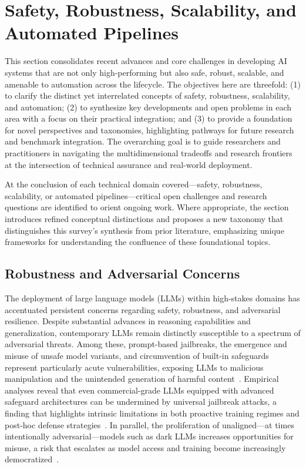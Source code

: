 \documentclass[sigconf]{acmart}
\begin{document}
\section{Safety, Robustness, Scalability, and Automated Pipelines}

This section consolidates recent advances and core challenges in developing AI systems that are not only high-performing but also safe, robust, scalable, and amenable to automation across the lifecycle. The objectives here are threefold: (1) to clarify the distinct yet interrelated concepts of safety, robustness, scalability, and automation; (2) to synthesize key developments and open problems in each area with a focus on their practical integration; and (3) to provide a foundation for novel perspectives and taxonomies, highlighting pathways for future research and benchmark integration. The overarching goal is to guide researchers and practitioners in navigating the multidimensional tradeoffs and research frontiers at the intersection of technical assurance and real-world deployment.


At the conclusion of each technical domain covered—safety, robustness, scalability, or automated pipelines—critical open challenges and research questions are identified to orient ongoing work. Where appropriate, the section introduces refined conceptual distinctions and proposes a new taxonomy that distinguishes this survey's synthesis from prior literature, emphasizing unique frameworks for understanding the confluence of these foundational topics.

\subsection{Robustness and Adversarial Concerns}

The deployment of large language models (LLMs) within high-stakes domains has accentuated persistent concerns regarding safety, robustness, and adversarial resilience. Despite substantial advances in reasoning capabilities and generalization, contemporary LLMs remain distinctly susceptible to a spectrum of adversarial threats. Among these, prompt-based jailbreaks, the emergence and misuse of unsafe model variants, and circumvention of built-in safeguards represent particularly acute vulnerabilities, exposing LLMs to malicious manipulation and the unintended generation of harmful content~\cite{ref78,ref82}. Empirical analyses reveal that even commercial-grade LLMs equipped with advanced safeguard architectures can be undermined by universal jailbreak attacks, a finding that highlights intrinsic limitations in both proactive training regimes and post-hoc defense strategies~\cite{ref82}. In parallel, the proliferation of unaligned—at times intentionally adversarial—models such as dark LLMs increases opportunities for misuse, a risk that escalates as model access and training become increasingly democratized~\cite{ref82,ref78}.
\end{document}
